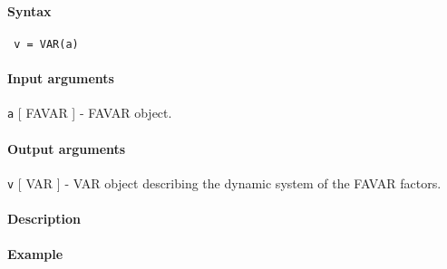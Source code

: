 


	\paragraph{Syntax}
 
 \begin{verbatim}
 v = VAR(a)
 \end{verbatim}
 
 \paragraph{Input arguments}
 
 \texttt{a} {[} FAVAR {]} - FAVAR object.
 
 \paragraph{Output arguments}
 
 \texttt{v} {[} VAR {]} - VAR object describing the dynamic system of the
 FAVAR factors.
 
 \paragraph{Description}
 
 \paragraph{Example}


